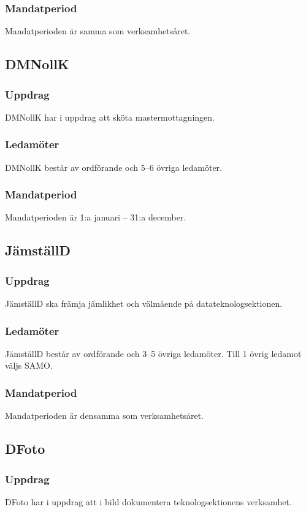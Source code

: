 \subsubsection{Mandatperiod}
Mandatperioden är samma som verksamhetsåret.

\subsection{DMNollK}
\subsubsection{Uppdrag}
DMNollK har i uppdrag att sköta mastermottagningen.
\subsubsection{Ledamöter}
DMNollK består av ordförande och 5--6 övriga ledamöter.
\subsubsection{Mandatperiod}
Mandatperioden är 1:a januari -- 31:a december.

\subsection{JämställD}
\subsubsection{Uppdrag}
JämställD ska främja jämlikhet och välmående på datateknologsektionen.
\subsubsection{Ledamöter}
JämställD består av ordförande och 3--5 övriga ledamöter. Till 1 övrig ledamot väljs SAMO.
\subsubsection{Mandatperiod}
Mandatperioden är densamma som verksamhetsåret.

\subsection{DFoto}
\subsubsection{Uppdrag}
DFoto har i uppdrag att i bild dokumentera teknologsektionens verksamhet.
